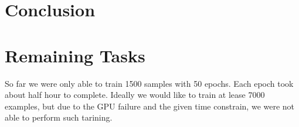 \documentclass[12pt]{article}
\begin{document}
\section{Conclusion}




\section{Remaining Tasks}
So far we were only able to train 1500 samples with 50 epochs. Each epoch took about half hour to complete. Ideally we would like to train at lease 7000 examples, but due to the GPU failure and the given time constrain, we were not able to perform such tarining.


\end{document}
